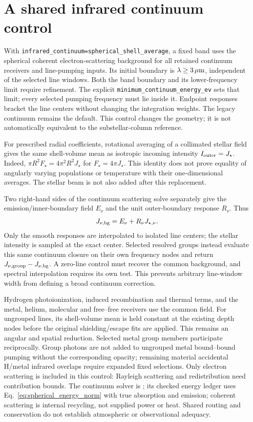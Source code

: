 \documentclass[10pt,a4paper]{article}
\begin{document}
\section{A shared infrared continuum control}
With \texttt{infrared\_continuum=spherical\_shell\_average}, a fixed band
uses the spherical coherent electron-scattering background for all retained
continuum receivers and line-pumping inputs. Its initial boundary is
$\lambda\geq3\,\mu{\rm m}$, independent of the selected line windows.
Both the band boundary and its lower-frequency limit require refinement.
The explicit \texttt{minimum\_continuum\_energy\_ev} sets that limit;
every selected pumping frequency must lie inside it. Endpoint responses
bracket the line centers without changing the integration weights.
The legacy continuum remains the default. This control changes the geometry;
it is not automatically equivalent to the substellar-column reference.

For prescribed radial coefficients, rotational averaging of a collimated
stellar field gives the same shell-volume mean as isotropic incoming
intensity $I_{\rm outer}=J_\star$. Indeed,
$\pi R^2 F_\star=4\pi^2R^2J_\star$ for $F_\star=4\pi J_\star$.
This identity does not prove equality of angularly varying populations or
temperature with their one-dimensional averages. The stellar beam is not
also added after this replacement.

Two right-hand sides of the continuum scattering solve separately give
the emission/inner-boundary field $E_\nu$ and the unit outer-boundary
response $R_\nu$. Thus
\begin{equation}
 J_{\nu,\rm bg}=E_\nu+R_\nu J_{\star,\nu}.
 \label{eq:infrared_shared_field}
\end{equation}
Only the smooth responses are interpolated to isolated line centers; the
stellar intensity is sampled at the exact center. Selected resolved groups
instead evaluate this same continuum closure on their own frequency nodes
and return $J_{\nu,\rm group}-J_{\nu,\rm bg}$. A zero-line control must
recover the common background, and spectral interpolation requires its own
test. This prevents arbitrary line-window width from defining a broad
continuum correction.

Hydrogen photoionization, induced recombination and thermal terms, and the
metal, helium, molecular and free--free receivers use the common field.
For ungrouped lines, its shell-volume mean is held constant at the existing
depth nodes before the original shielding/escape fits are applied. This
remains an angular and spatial reduction. Selected metal group members
participate reciprocally. Group photons are not added to ungrouped metal
bound--bound pumping without the corresponding opacity; remaining material
accidental H/metal infrared overlaps require expanded fixed selections.
Only electron scattering is included in this control: Rayleigh scattering
and redistribution need contribution bounds. The continuum solver is
; its checked
energy ledger uses Eq.~\eqref{eq:spherical_energy_norm} with true absorption
and emission; coherent scattering is internal recycling, not supplied power
or heat. Shared routing and conservation do not establish atmospheric or
observational adequacy.
\end{document}
